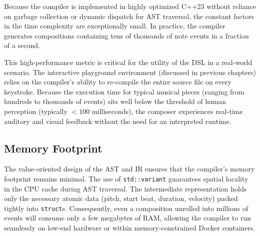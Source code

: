 Because the compiler is implemented in highly optimized C++23 without reliance on garbage collection or dynamic dispatch
for AST traversal, the constant factors in the time complexity are exceptionally small.
In practice, the compiler generates compositions containing tens of thousands of note events in a fraction of a second.

This high-performance metric is critical for the utility of the DSL in a real-world scenario.
The interactive playground environment (discussed in previous chapters) relies on the compiler's ability to re-compile
the entire source file on every keystroke.
Because the execution time for typical musical pieces (ranging from hundreds to thousands of events) sits well below the
threshold of human perception (typically $<100$ milliseconds), the composer experiences real-time auditory and visual
feedback without the need for an interpreted runtime.

\subsection{Memory Footprint}\label{subsec:memory-footprint}

The value-oriented design of the AST and IR ensures that the compiler's memory footprint remains minimal.
The use of \texttt{std::variant} guarantees spatial locality in the CPU cache during AST traversal.
The intermediate representation holds only the necessary atomic data (pitch, start beat, duration, velocity) packed
tightly into \texttt{struct}s. Consequently, even a composition unrolled into millions of events will consume only a few
megabytes of RAM, allowing the compiler to run seamlessly on low-end hardware or within memory-constrained Docker
containers.
